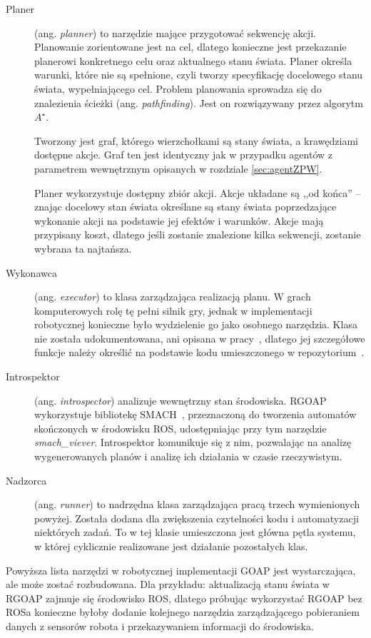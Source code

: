 \begin{description}
\item[Planer] {(ang. \textit{planner}) to narzędzie mające przygotować sekwencję akcji. Planowanie zorientowane jest na cel, dlatego konieczne jest przekazanie planerowi konkretnego celu oraz aktualnego stanu świata. Planer określa warunki, które nie są spełnione, czyli tworzy specyfikację docelowego stanu świata, wypełniającego cel. Problem planowania sprowadza się do znalezienia ścieżki (ang. \textit{pathfinding}). Jest on rozwiązywany przez algorytm $A^\star$.~\cite{ORKI, ORKIarch}

Tworzony jest graf, którego wierzchołkami są stany świata, a krawędziami dostępne akcje. Graf ten jest identyczny jak w przypadku agentów z parametrem wewnętrznym opisanych w rozdziale \ref{sec:agentZPW}. 

Planer wykorzystuje dostępny zbiór akcji. Akcje układane są ,,od końca'' – znając docelowy stan świata określane są stany świata poprzedzające wykonanie akcji na podstawie jej efektów i warunków. Akcje mają przypisany koszt, dlatego jeśli zostanie znalezione kilka sekwencji, zostanie wybrana ta najtańsza. 
}
\item[Wykonawca] {(ang. \textit{executor}) to klasa zarządzająca realizacją planu. W grach komputerowych rolę tę pełni silnik gry, jednak w implementacji robotycznej konieczne było wydzielenie go jako osobnego narzędzia. Klasa nie została udokumentowana, ani opisana w pracy~\cite{KOLB}, dlatego jej szczegółowe funkcje należy określić na podstawie kodu umieszczonego w repozytorium~\cite{KOLBrgoap}. 
}
\item[Introspektor] {(ang. \textit{introspector}) analizuje wewnętrzny stan środowiska. RGOAP wykorzystuje bibliotekę SMACH~\cite{SMACH}, przeznaczoną do tworzenia automatów skończonych w środowisku ROS, udostępniając przy tym narzędzie \textit{smach\_viever}. Introspektor komunikuje się z nim, pozwalając na analizę wygenerowanych planów i analizę ich działania w czasie rzeczywistym.}
\item[Nadzorca] {(ang. \textit{runner}) to nadrzędna klasa zarządzająca pracą trzech wymienionych powyżej. Została dodana dla zwiększenia czytelności kodu i automatyzacji niektórych zadań. To w tej klasie umieszczona jest główna pętla systemu, w której cyklicznie realizowane jest działanie pozostałych klas.}
\end{description}

Powyższa lista narzędzi w robotycznej implementacji GOAP jest wystarczająca, ale może zostać rozbudowana. Dla przykładu: aktualizacją stanu świata w RGOAP zajmuje się środowisko ROS, dlatego próbując wykorzystać RGOAP bez ROSa konieczne byłoby dodanie kolejnego narzędzia zarządzającego pobieraniem danych z sensorów robota i przekazywaniem informacji do środowiska.

